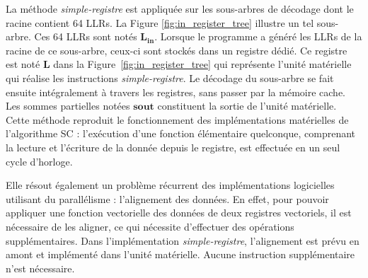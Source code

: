 La méthode \textit{simple-registre} est appliquée sur les sous-arbres de décodage dont le \noeud racine contient 64 LLRs. La Figure \ref{fig:in_register_tree} illustre un tel sous-arbre.
Ces 64 LLRs sont notés $\mathbold{L_{in}}$.
Lorsque le programme a généré les LLRs de la racine de ce sous-arbre, ceux-ci sont stockés dans un registre dédié.
Ce registre est noté $\mathbold{L}$ dans la Figure~\ref{fig:in_register_tree} qui représente l'unité matérielle qui réalise les instructions \textit{simple-registre}.
Le décodage du sous-arbre se fait ensuite intégralement à travers les registres, sans passer par la mémoire cache.
Les sommes partielles notées $\mathbold{s{out}}$ constituent la sortie de l'unité matérielle.
Cette méthode reproduit le fonctionnement des implémentations matérielles de l'algorithme SC : l'exécution d'une fonction élémentaire quelconque, comprenant la lecture et l'écriture de la donnée depuis le registre, est effectuée en un seul cycle d'horloge.





Elle résout également un problème récurrent des implémentations logicielles utilisant du parallélisme : l'alignement des données. En effet, pour pouvoir appliquer une fonction vectorielle des données de deux registres vectoriels, il est nécessaire de les aligner, ce qui nécessite d'effectuer des opérations supplémentaires. Dans l'implémentation \textit{simple-registre}, l'alignement est prévu en amont et implémenté dans l'unité matérielle. Aucune instruction supplémentaire n'est nécessaire. 

